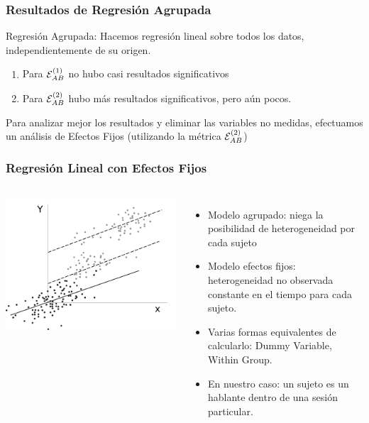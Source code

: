 \begin{frame}
\frametitle{Resultados de Regresión Agrupada}

  Regresión Agrupada: Hacemos regresión lineal sobre todos los datos, independientemente de su origen.

  \begin{enumerate}
    \item Para $\mathcal{E}_{AB}^{(1)}$ no hubo casi resultados significativos
    \item Para $\mathcal{E}_{AB}^{(2)}$ hubo más resultados significativos, pero aún pocos.
  \end{enumerate}

  Para analizar mejor los resultados y eliminar las variables no medidas, efectuamos un análisis de Efectos Fijos (utilizando la métrica $\mathcal{E}_{AB}^{(2)}$)
\end{frame}

\begin{frame}
\frametitle{Regresión Lineal con Efectos Fijos}

  \begin{columns}
    \includegraphics[width=\textwidth]{images/fixed_effects_example.pdf}
    \begin{itemize}
      \item Modelo agrupado: niega la posibilidad de heterogeneidad por cada sujeto
      \item Modelo efectos fijos: heterogeneidad no observada constante en el tiempo para cada sujeto.
      \item Varias formas equivalentes de calcularlo: Dummy Variable, Within Group.
      \item En nuestro caso: un sujeto es un hablante dentro de una sesión particular.
    \end{itemize}
  \end{columns}
\end{frame}


